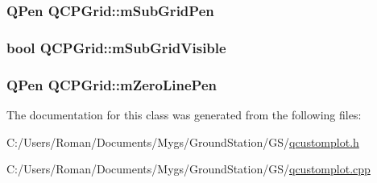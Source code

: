 \subsubsection[{m\+Sub\+Grid\+Pen}]{\setlength{\rightskip}{0pt plus 5cm}Q\+Pen Q\+C\+P\+Grid\+::m\+Sub\+Grid\+Pen\hspace{0.3cm}{\ttfamily [protected]}}\label{class_q_c_p_grid_aa9004bc139ad3ea92629f0aaae81d83f}
\hypertarget{class_q_c_p_grid_a4e4a0400d6319bb44c06341f6298c87b}{}
\subsubsection[{m\+Sub\+Grid\+Visible}]{\setlength{\rightskip}{0pt plus 5cm}bool Q\+C\+P\+Grid\+::m\+Sub\+Grid\+Visible\hspace{0.3cm}{\ttfamily [protected]}}\label{class_q_c_p_grid_a4e4a0400d6319bb44c06341f6298c87b}
\hypertarget{class_q_c_p_grid_a379481871f17655c27eda30af233554f}{}
\subsubsection[{m\+Zero\+Line\+Pen}]{\setlength{\rightskip}{0pt plus 5cm}Q\+Pen Q\+C\+P\+Grid\+::m\+Zero\+Line\+Pen\hspace{0.3cm}{\ttfamily [protected]}}\label{class_q_c_p_grid_a379481871f17655c27eda30af233554f}


The documentation for this class was generated from the following files\+:\begin{DoxyCompactItemize}
\item 
C\+:/\+Users/\+Roman/\+Documents/\+Mygs/\+Ground\+Station/\+G\+S/\hyperlink{qcustomplot_8h}{qcustomplot.\+h}\item 
C\+:/\+Users/\+Roman/\+Documents/\+Mygs/\+Ground\+Station/\+G\+S/\hyperlink{qcustomplot_8cpp}{qcustomplot.\+cpp}\end{DoxyCompactItemize}
